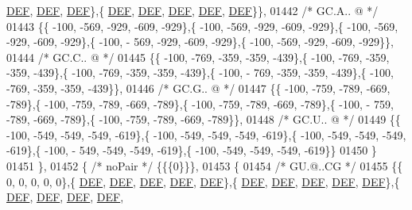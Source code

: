 \begin{DoxyCode}
      \mbox{\hyperlink{1_88_84__epars_8h_a397419fc12b37ed479c8abb9d444d843}{DEF}},  \mbox{\hyperlink{1_88_84__epars_8h_a397419fc12b37ed479c8abb9d444d843}{DEF}},  \mbox{\hyperlink{1_88_84__epars_8h_a397419fc12b37ed479c8abb9d444d843}{DEF}}\},\{  \mbox{\hyperlink{1_88_84__epars_8h_a397419fc12b37ed479c8abb9d444d843}{DEF}},  \mbox{\hyperlink{1_88_84__epars_8h_a397419fc12b37ed479c8abb9d444d843}{DEF}},  \mbox{\hyperlink{1_88_84__epars_8h_a397419fc12b37ed479c8abb9d444d843}{DEF}},  \mbox{\hyperlink{1_88_84__epars_8h_a397419fc12b37ed479c8abb9d444d843}{DEF}},  \mbox{\hyperlink{1_88_84__epars_8h_a397419fc12b37ed479c8abb9d444d843}{DEF}}\}\},
01442 \textcolor{comment}{/* GC.A.. @ */}
01443 \{\{ -100, -569, -929, -609, -929\},\{ -100, -569, -929, -609, -929\},\{ -100, -569, -929, -609, -929\},\{ -100, -
      569, -929, -609, -929\},\{ -100, -569, -929, -609, -929\}\},
01444 \textcolor{comment}{/* GC.C.. @ */}
01445 \{\{ -100, -769, -359, -359, -439\},\{ -100, -769, -359, -359, -439\},\{ -100, -769, -359, -359, -439\},\{ -100, -
      769, -359, -359, -439\},\{ -100, -769, -359, -359, -439\}\},
01446 \textcolor{comment}{/* GC.G.. @ */}
01447 \{\{ -100, -759, -789, -669, -789\},\{ -100, -759, -789, -669, -789\},\{ -100, -759, -789, -669, -789\},\{ -100, -
      759, -789, -669, -789\},\{ -100, -759, -789, -669, -789\}\},
01448 \textcolor{comment}{/* GC.U.. @ */}
01449 \{\{ -100, -549, -549, -549, -619\},\{ -100, -549, -549, -549, -619\},\{ -100, -549, -549, -549, -619\},\{ -100, -
      549, -549, -549, -619\},\{ -100, -549, -549, -549, -619\}\}
01450 \}
01451 \},
01452 \{ \textcolor{comment}{/* noPair */} \{\{\{0\}\}\},
01453 \{
01454 \textcolor{comment}{/* GU.@..CG */}
01455 \{\{    0,    0,    0,    0,    0\},\{  \mbox{\hyperlink{1_88_84__epars_8h_a397419fc12b37ed479c8abb9d444d843}{DEF}},  \mbox{\hyperlink{1_88_84__epars_8h_a397419fc12b37ed479c8abb9d444d843}{DEF}},  \mbox{\hyperlink{1_88_84__epars_8h_a397419fc12b37ed479c8abb9d444d843}{DEF}},  \mbox{\hyperlink{1_88_84__epars_8h_a397419fc12b37ed479c8abb9d444d843}{DEF}},  \mbox{\hyperlink{1_88_84__epars_8h_a397419fc12b37ed479c8abb9d444d843}{DEF}}\},\{  
      \mbox{\hyperlink{1_88_84__epars_8h_a397419fc12b37ed479c8abb9d444d843}{DEF}},  \mbox{\hyperlink{1_88_84__epars_8h_a397419fc12b37ed479c8abb9d444d843}{DEF}},  \mbox{\hyperlink{1_88_84__epars_8h_a397419fc12b37ed479c8abb9d444d843}{DEF}},  \mbox{\hyperlink{1_88_84__epars_8h_a397419fc12b37ed479c8abb9d444d843}{DEF}},  \mbox{\hyperlink{1_88_84__epars_8h_a397419fc12b37ed479c8abb9d444d843}{DEF}}\},\{  \mbox{\hyperlink{1_88_84__epars_8h_a397419fc12b37ed479c8abb9d444d843}{DEF}},  \mbox{\hyperlink{1_88_84__epars_8h_a397419fc12b37ed479c8abb9d444d843}{DEF}},  \mbox{\hyperlink{1_88_84__epars_8h_a397419fc12b37ed479c8abb9d444d843}{DEF}},  \mbox{\hyperlink{1_88_84__epars_8h_a397419fc12b37ed479c8abb9d444d843}{DEF}},  

\end{DoxyCode}
